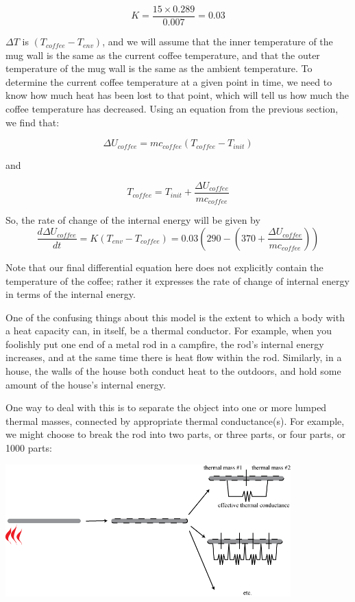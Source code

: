 $$K = \frac {15 \times 0.289 }{0.007}=0.03$$

$\Delta T$ is $(T_{coffee} - T_{env})$, and we will assume that the inner temperature of the mug wall is the same as the current coffee temperature, and that the outer temperature of the mug wall is the same as the ambient temperature. To determine the current coffee temperature at a given point in time, we need to know how much heat has been lost to that point, which will tell us how much the coffee temperature has decreased. Using an equation from the previous section, we find that:

$$\Delta U_{coffee}=mc_{coffee}(T_{coffee}-T_{init})$$

and

$$T_{coffee}=T_{init} + \frac{\Delta U_{coffee}}{mc_{coffee}}$$

So, the rate of change of the internal energy will be given by
$$\frac{d\Delta U_{coffee}}{dt} = K (T_{env}-T_{coffee}) = 0.03\left(290 - \left(370+\frac{\Delta U_{coffee}}{mc_{coffee}} \right) \right)$$

Note that our final differential equation here does not explicitly contain the temperature of the coffee; rather it expresses the rate of change of internal energy in terms of the internal energy.

One of the confusing things about this model is the extent to which a body with a heat capacity can, in itself, be a thermal conductor.  For example, when you foolishly put one end of a metal rod in a campfire, the rod's internal energy increases, and at the same time there is heat flow within the rod.   Similarly, in a house, the walls of the house both conduct heat to the outdoors, and hold some amount of the house's internal energy.

One way to deal with this is to separate the object into one or more lumped thermal masses, connected by appropriate thermal conductance(s).  For example, we might choose to break the rod into two parts, or three parts, or four parts, or 1000 parts:

\beforefig
 \centerline{\includegraphics[height=2in]{figs/BreakingUpARod}}
\afterfig

